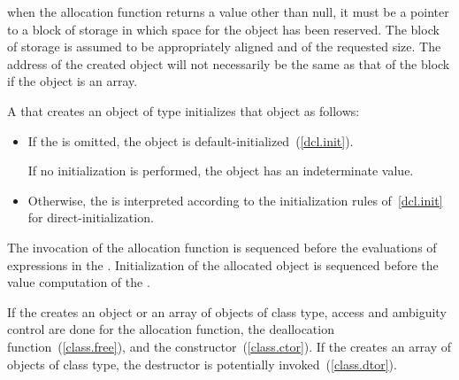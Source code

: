 \pnum
\begin{note}
when the allocation function returns a value other than null, it must be
a pointer to a block of storage in which space for the object has been
reserved. The block of storage is assumed to be appropriately aligned
and of the requested size. The address of the created object will not
necessarily be the same as that of the block if the object is an array.
\end{note}

\pnum
{}%
%
%
%
%
%
%
A  that creates an object of type 
initializes that object as follows:

\begin{itemize}
\item If the  is omitted, the object is
default-initialized~(\ref{dcl.init}). \begin{note} If no initialization
is performed, the object has an indeterminate value. \end{note}

\item Otherwise, the  is interpreted according to
the initialization rules of~\ref{dcl.init} for direct-initialization.
\end{itemize}

\pnum
{}%
%
The invocation of the allocation function is sequenced before
the evaluations of expressions in the . Initialization of
the allocated object is sequenced before the
%
value computation of the
.

\pnum
If the  creates an object or an array of
objects of class type, access and ambiguity control are done for the
allocation function, the deallocation function~(\ref{class.free}), and
the constructor~(\ref{class.ctor}). If the 
creates an array of objects of class type, the destructor is potentially
invoked~(\ref{class.dtor}).

